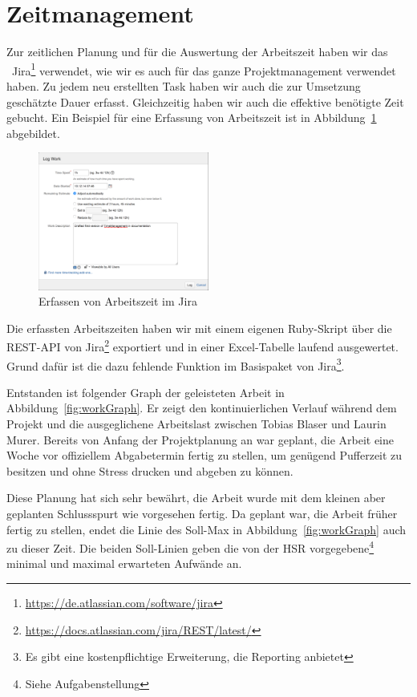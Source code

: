\chapter*{Zeitmanagement}
	Zur zeitlichen Planung und für die Auswertung der Arbeitszeit haben wir das \ppt\ Jira\footnote{\url{https://de.atlassian.com/software/jira}} verwendet,
	wie wir es auch für das ganze Projektmanagement verwendet haben.
	Zu jedem neu erstellten Task haben wir auch die zur Umsetzung geschätzte Dauer erfasst.
	Gleichzeitig haben wir auch die effektive benötigte Zeit gebucht.
	Ein Beispiel für eine Erfassung von Arbeitszeit ist in Abbildung~\ref{fig:logWork} abgebildet.
	
	\begin{figure}[H]
		\includegraphics[width=0.5\textwidth]{projectPlan/media/img/logWork.png}
		\centering
		\caption{Erfassen von Arbeitszeit im Jira}
		\label{fig:logWork}
	\end{figure}
	
	Die erfassten Arbeitszeiten haben wir mit einem eigenen Ruby-Skript über die REST-API von Jira\footnote{\url{https://docs.atlassian.com/jira/REST/latest/}} exportiert
	und in einer Excel-Tabelle laufend ausgewertet.
	Grund dafür ist die dazu fehlende Funktion im Basispaket von Jira\footnote{Es gibt eine kostenpflichtige Erweiterung, die Reporting anbietet}.
	
	Entstanden ist folgender Graph der geleisteten Arbeit in Abbildung~\ref{fig:workGraph}.
	Er zeigt den kontinuierlichen Verlauf während dem Projekt
	und die ausgeglichene Arbeitslast zwischen Tobias Blaser und Laurin Murer.
	Bereits von Anfang der Projektplanung an war geplant, die Arbeit eine Woche vor offiziellem Abgabetermin fertig zu stellen, um genügend Pufferzeit zu besitzen und ohne Stress drucken und abgeben zu können.
	
	Diese Planung hat sich sehr bewährt, die Arbeit wurde mit dem kleinen aber geplanten Schlussspurt wie vorgesehen fertig.
	Da geplant war, die Arbeit früher fertig zu stellen, endet die Linie des Soll-Max in Abbildung~\ref{fig:workGraph} auch zu dieser Zeit.
	Die beiden Soll-Linien geben die von der HSR vorgegebene\footnote{Siehe Aufgabenstellung} minimal und maximal erwarteten Aufwände an.
	

